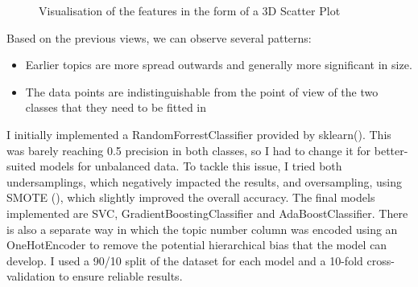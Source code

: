 \documentclass[12pt,MSc,a4paper,oneside]{muthesis}
\begin{document}
\begin{figure}[h]
    \centering
    \caption{Visualisation of the features in the form of a 3D Scatter Plot}
    \label{fig:foobar}
\end{figure}

\newpage

Based on the previous views, we can observe several patterns:
\begin{itemize}
    \item Earlier topics are more spread outwards and generally more significant in size.
    \item The data points are indistinguishable from the point of view of the two classes that they need to be fitted in 
\end{itemize}
 
I initially implemented a RandomForrestClassifier provided by sklearn(\cite{scikit-learn}). This was barely reaching 0.5 precision in both classes, so I had to change it for better-suited models for unbalanced data. To tackle this issue, I tried both undersamplings, which negatively impacted the results, and oversampling, using SMOTE (\cite{JMLR:v18:16-365}), which slightly improved the overall accuracy.
The final models implemented are SVC, GradientBoostingClassifier and AdaBoostClassifier.
There is also a separate way in which the topic number column was encoded using an OneHotEncoder to remove the potential hierarchical bias that the model can develop.
I used a 90/10 split of the dataset for each model and a 10-fold cross-validation to ensure reliable results.
\end{document}
